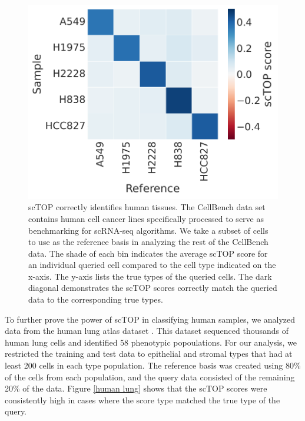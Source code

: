 \documentclass[aps,superscriptaddress, notitlepage,longbibliography]{revtex4-1}
\begin{document}
\begin{figure}
	\centering
		\includegraphics[scale=0.5]{figs/cellbench heatmap.pdf} 
	\caption{scTOP correctly identifies human tissues. The CellBench data set contains human cell cancer lines specifically processed to serve as benchmarking for scRNA-seq algorithms. We take a subset of cells to use as the reference basis in analyzing the rest of the CellBench data. The shade of each bin indicates the average scTOP score for an individual queried cell compared to the cell type indicated on the x-axis. The y-axis lists the true types of the queried cells. The dark diagonal demonstrates the scTOP scores correctly match the queried data to the corresponding true types.}
	\label{cellbench}
\end{figure}

To further prove the power of scTOP in classifying human samples, we analyzed data from the human lung atlas dataset \cite{travaglini_molecular_2020}. This dataset sequenced thousands of human lung cells and identified 58 phenotypic popoulations. For our analysis, we restricted the training and test data to epithelial and stromal types that had at least 200 cells in each type population. The reference basis was created using 80\% of the cells from each population, and the query data consisted of the remaining 20\% of the data. Figure \ref{human lung} shows that the scTOP scores were consistently high in cases where the score type matched the true type of the query.
\end{document}

